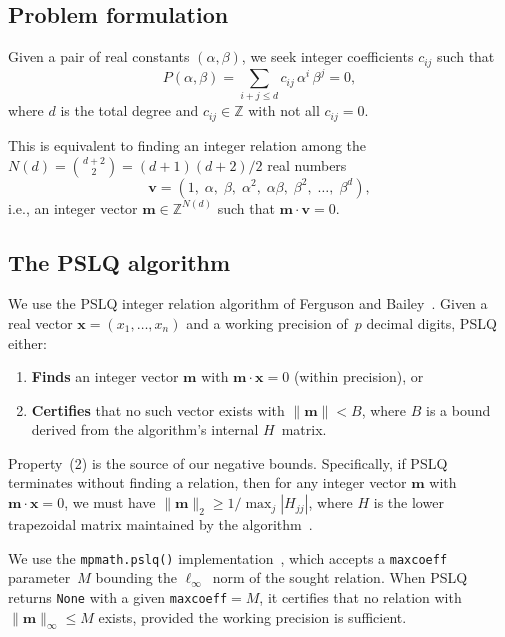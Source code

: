 \documentclass[11pt]{amsart}
\theoremstyle{remark}
\newcommand{\Z}{\mathbb{Z}}
\newcommand{\norm}[1]{\lVert #1 \rVert}
\begin{document}
\subsection{Problem formulation}\label{ssec:formulation}

Given a pair of real constants $(\alpha,\beta)$, we seek integer coefficients
$c_{ij}$ such that
\begin{equation}\label{eq:poly}
  P(\alpha,\beta) = \sum_{i+j\le d} c_{ij}\,\alpha^i\,\beta^j = 0,
\end{equation}
where $d$ is the total degree and $c_{ij}\in\Z$ with not all $c_{ij}=0$.

This is equivalent to finding an integer relation among the
$N(d) = \binom{d+2}{2} = (d+1)(d+2)/2$ real numbers
\begin{equation}\label{eq:monvec}
  \mathbf{v} = (1,\;\alpha,\;\beta,\;\alpha^2,\;\alpha\beta,\;\beta^2,\;\ldots,\;\beta^d),
\end{equation}
i.e., an integer vector $\mathbf{m}\in\Z^{N(d)}$ such that
$\mathbf{m}\cdot\mathbf{v}=0$.

\subsection{The PSLQ algorithm}\label{ssec:pslq}

We use the PSLQ integer relation algorithm of Ferguson and
Bailey~\cite{FergusonBailey1991,FergusonBaileyArno1999}. Given a real vector
$\mathbf{x}=(x_1,\ldots,x_n)$ and a working precision of~$p$ decimal digits, PSLQ
either:
\begin{enumerate}
\item \textbf{Finds} an integer vector $\mathbf{m}$ with
  $\mathbf{m}\cdot\mathbf{x}=0$ (within precision), or
\item \textbf{Certifies} that no such vector exists with $\norm{\mathbf{m}}<B$,
  where $B$ is a bound derived from the algorithm's internal $H$~matrix.
\end{enumerate}

Property~(2) is the source of our negative bounds. Specifically, if PSLQ terminates
without finding a relation, then for any integer vector $\mathbf{m}$ with
$\mathbf{m}\cdot\mathbf{x}=0$, we must have
$\norm{\mathbf{m}}_2 \ge 1/\max_j |H_{jj}|$, where $H$ is the lower trapezoidal
matrix maintained by the algorithm~\cite[Theorem~1]{FergusonBaileyArno1999}.

We use the \texttt{mpmath.pslq()} implementation~\cite{mpmath}, which accepts a
\texttt{maxcoeff} parameter~$M$ bounding the $\ell_\infty$~norm of the sought
relation. When PSLQ returns \texttt{None} with a given \texttt{maxcoeff}${}=M$, it
certifies that no relation with $\norm{\mathbf{m}}_\infty\le M$ exists, provided the
working precision is sufficient.
\end{document}
